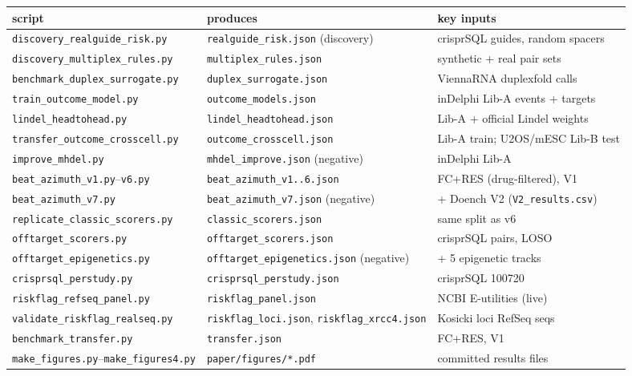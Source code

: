 \begin{center}
\small
\begin{tabular}{p{5.2cm}p{5.6cm}p{4.2cm}}
script & produces & key inputs \\\hline
\texttt{discovery\_realguide\_risk.py} & \texttt{realguide\_risk.json}
 (discovery) & crisprSQL guides, random spacers \\
\texttt{discovery\_multiplex\_rules.py} & \texttt{multiplex\_rules.json}
 & synthetic + real pair sets \\
\texttt{benchmark\_duplex\_surrogate.py} & \texttt{duplex\_surrogate.json}
 & ViennaRNA duplexfold calls \\
\texttt{train\_outcome\_model.py} & \texttt{outcome\_models.json} &
 inDelphi Lib-A events + targets \\
\texttt{lindel\_headtohead.py} & \texttt{lindel\_headtohead.json} &
 Lib-A + official Lindel weights \\
\texttt{transfer\_outcome\_crosscell.py} & \texttt{outcome\_crosscell.json}
 & Lib-A train; U2OS/mESC Lib-B test \\
\texttt{improve\_mhdel.py} & \texttt{mhdel\_improve.json} (negative) &
 inDelphi Lib-A \\
\texttt{beat\_azimuth\_v1.py}--\texttt{v6.py} &
 \texttt{beat\_azimuth\_v1..6.json} & FC+RES (drug-filtered), V1 \\
\texttt{beat\_azimuth\_v7.py} & \texttt{beat\_azimuth\_v7.json} (negative)
 & + Doench V2 (\texttt{V2\_results.csv}) \\
\texttt{replicate\_classic\_scorers.py} & \texttt{classic\_scorers.json} &
 same split as v6 \\
\texttt{offtarget\_scorers.py} & \texttt{offtarget\_scorers.json} &
 crisprSQL pairs, LOSO \\
\texttt{offtarget\_epigenetics.py} & \texttt{offtarget\_epigenetics.json}
 (negative) & + 5 epigenetic tracks \\
\texttt{crisprsql\_perstudy.py} & \texttt{crisprsql\_perstudy.json} &
 crisprSQL 100720 \\
\texttt{riskflag\_refseq\_panel.py} & \texttt{riskflag\_panel.json} &
 NCBI E-utilities (live) \\
\texttt{validate\_riskflag\_realseq.py} & \texttt{riskflag\_loci.json},
 \texttt{riskflag\_xrcc4.json} & Kosicki loci RefSeq seqs \\
\texttt{benchmark\_transfer.py} & \texttt{transfer.json} & FC+RES, V1 \\
\texttt{make\_figures.py}--\texttt{make\_figures4.py} &
 \texttt{paper/figures/*.pdf} & committed results files \\
\end{tabular}
\end{center}

